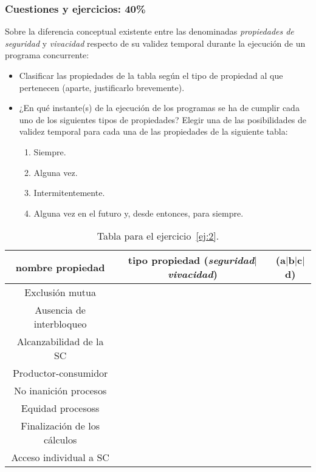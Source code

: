\documentclass[12pt]{article}
\begin{document}
    \subsubsection*{Cuestiones y ejercicios: 40\%}
    \begin{ejercicio}\label{ej:2}
        Sobre la diferencia conceptual existente entre las denominadas \textit{propiedades de seguridad} y \textit{vivacidad} respecto de su validez temporal durante la ejecución de un programa concurrente:
        \begin{itemize}
            \item Clasificar las propiedades de la tabla según el tipo de propiedad al que pertenecen (aparte, justificarlo brevemente).
            \item ¿En qué instante(s) de la ejecución de los programas se ha de cumplir cada uno de los siguientes tipos de propiedades? Elegir una de las posibilidades de validez temporal para cada una de las propiedades de la siguiente tabla:
                \begin{enumerate}[label=(\alph*)]
                    \item Siempre.
                    \item Alguna vez.
                    \item Intermitentemente.
                    \item Alguna vez en el futuro y, desde entonces, para siempre.
                \end{enumerate}
        \end{itemize}
        \begin{table}[H]
        \centering
        \begin{tabular}{|c|c|c|}
            \hline
            \textbf{nombre propiedad} & \textbf{tipo propiedad} (\textit{seguridad}$|$\textit{vivacidad}) & (\textbf{a}$|$\textbf{b}$|$\textbf{c}$|$\textbf{d}) \\
            \hline
            Exclusión mutua & & \\
            \hline
            Ausencia de interbloqueo & & \\
            \hline
            Alcanzabilidad de la SC & & \\
            \hline
            Productor-consumidor & & \\
            \hline
            No inanición procesos & & \\
            \hline
            Equidad procesoss & & \\
            \hline
            Finalización de los cálculos & & \\
            \hline
            Acceso individual a SC & & \\
            \hline
        \end{tabular}
        \caption{Tabla para el ejercicio~\ref{ej:2}.}
        \end{table}
    \end{ejercicio}
\end{document}
